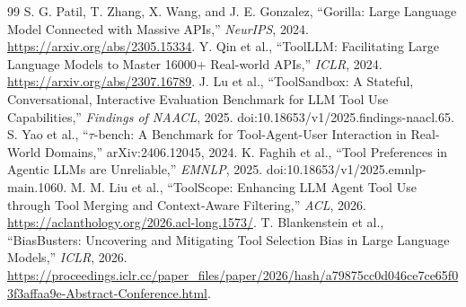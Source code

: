 \documentclass[10pt,a4paper]{article}
\begin{document}
\begin{thebibliography}{99}\small
{} S. G. Patil, T. Zhang, X. Wang, and J. E. Gonzalez, ``Gorilla: Large Language Model Connected with Massive APIs,'' \emph{NeurIPS}, 2024. \url{https://arxiv.org/abs/2305.15334}.
 Y. Qin et al., ``ToolLLM: Facilitating Large Language Models to Master 16000+ Real-world APIs,'' \emph{ICLR}, 2024. \url{https://arxiv.org/abs/2307.16789}.
 J. Lu et al., ``ToolSandbox: A Stateful, Conversational, Interactive Evaluation Benchmark for LLM Tool Use Capabilities,'' \emph{Findings of NAACL}, 2025. doi:10.18653/v1/2025.findings-naacl.65.
 S. Yao et al., ``$\tau$-bench: A Benchmark for Tool-Agent-User Interaction in Real-World Domains,'' arXiv:2406.12045, 2024.
 K. Faghih et al., ``Tool Preferences in Agentic LLMs are Unreliable,'' \emph{EMNLP}, 2025. doi:10.18653/v1/2025.emnlp-main.1060.
 M. M. Liu et al., ``ToolScope: Enhancing LLM Agent Tool Use through Tool Merging and Context-Aware Filtering,'' \emph{ACL}, 2026. \url{https://aclanthology.org/2026.acl-long.1573/}.
 T. Blankenstein et al., ``BiasBusters: Uncovering and Mitigating Tool Selection Bias in Large Language Models,'' \emph{ICLR}, 2026. \url{https://proceedings.iclr.cc/paper_files/paper/2026/hash/a79875cc0d046ce7ce65f03f3affaa9e-Abstract-Conference.html}.
\end{thebibliography}
\end{document}

